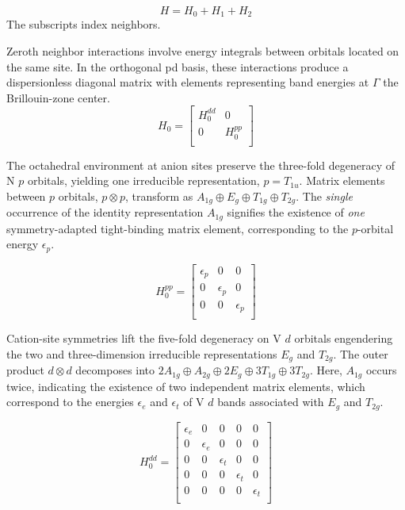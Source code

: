 \documentclass[preprint,showpacs,preprintnumbers,superscriptaddress,prb,floatfix,aps]{revtex4-1}
\begin{document}
\begin{equation}
H = H_0 + H_1 + H_2
\end{equation}
The subscripts index neighbors.

Zeroth neighbor interactions involve energy integrals between orbitals located on the same site. In the orthogonal pd basis, these interactions produce a dispersionless diagonal matrix with elements representing band energies at $\Gamma$ the Brillouin-zone center. 
\begin{equation}
H_0 =
\begin{bmatrix}
H_0^{dd} & 0 \\
 0 & H_0^{pp} \\
\end{bmatrix}
\end{equation}

The octahedral environment at anion sites preserve the three-fold degeneracy of N $p$ orbitals, yielding one irreducible representation, $p = T_{1u}$. Matrix elements between $p$ orbitals, $p \otimes p$, transform as $A_{1g} \oplus E_g \oplus T_{1g} \oplus T_{2g}$. The \emph{single} occurrence of the identity representation $A_{1g}$ signifies the existence of \emph{one} symmetry-adapted tight-binding matrix element, corresponding to the $p$-orbital energy $\epsilon_p$.

\begin{equation}
H_0^{pp} =
\begin{bmatrix}
\epsilon_{p} & 0 & 0 \\
0 & \epsilon_{p} & 0 \\
0 & 0 & \epsilon_{p} \\
\end{bmatrix}
\end{equation}

Cation-site symmetries lift the five-fold degeneracy on V $d$ orbitals engendering the two and three-dimension irreducible representations $E_g$ and $T_{2g}$. The outer product $d \otimes d$ decomposes into $2 A_{1g} \oplus A_{2g} \oplus 2 E_g \oplus 3 T_{1g} \oplus 3 T_{2g}$. Here, $A_{1g}$ occurs twice, indicating the existence of two independent matrix elements, which correspond to the energies $\epsilon_e$ and $\epsilon_t$ of V $d$ bands associated with $E_g$ and $T_{2g}$.

\begin{equation}
H_0^{dd} =
\begin{bmatrix}
 \epsilon_{e} & 0 & 0 & 0 & 0 \\
 0 & \epsilon_{e} & 0 & 0 & 0 \\
 0 & 0 & \epsilon_{t} & 0 & 0 \\
 0 & 0 & 0 & \epsilon_{t} & 0 \\
 0 & 0 & 0 & 0 & \epsilon_{t} \\
\end{bmatrix}
\end{equation}
\end{document}
